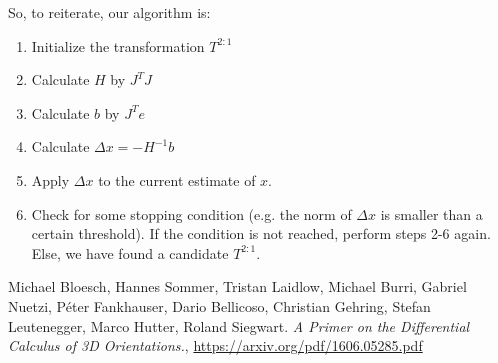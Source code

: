 \documentclass[twoside]{article}
\begin{document}
So, to reiterate, our algorithm is:
\begin{enumerate}
\item Initialize the transformation $T^{2:1}$ 
\item Calculate $H$ by $J^T J$
\item Calculate $b$ by $J^Te$ 
\item Calculate $\Delta x = -H^{-1} b $ 
\item Apply $\Delta x$ to the current estimate of $x$. 
\item Check for some stopping condition (e.g. the norm of $\Delta x$ is smaller than a certain threshold). If the condition is not reached, perform steps 2-6 again. Else, we have found a candidate $T^{2:1}$.
\end{enumerate}
 
\begin{thebibliography}{9}
Michael Bloesch, Hannes Sommer, Tristan Laidlow, Michael Burri, Gabriel Nuetzi, Péter Fankhauser, Dario Bellicoso, Christian Gehring, Stefan Leutenegger, Marco Hutter, Roland Siegwart. \textit{A Primer on the Differential Calculus of 3D Orientations.}, \url{https://arxiv.org/pdf/1606.05285.pdf}
\end{thebibliography}
\end{document}
